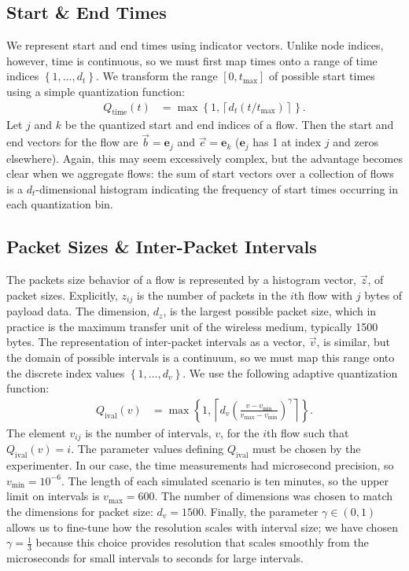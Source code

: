 \documentclass[conference]{IEEEtran}
\newcommand{\Qt}{Q_{\text{time}}}
\newcommand{\Qi}{Q_{\text{ival}}}
\newcommand{\set}[1]{\left\{#1\right\}}
\newcommand{\ceil}[1]{\left\lceil#1\right\rceil}
\newcommand{\fracp}[2]{\left(\frac{#1}{#2}\right)}
\newcommand{\fracpx}[2]{(#1/#2)}
\begin{document}
\subsection{Start \& End Times}

We represent start and end times using indicator vectors. Unlike node indices, however, time is continuous, so we must first map times onto a range of time indices $\set{1,\dots,d_t}$. We transform the range $[0,t_{\max}]$ of possible start times using a simple quantization function:
\begin{align}
\label{eqn:time-quantization}
\Qt(t) &= \max\set{1,\ceil{d_t\fracpx{t}{t_{\max}}}}.
\end{align}
Let $j$ and $k$ be the quantized start and end indices of a flow. Then the start and end vectors for the flow are $\vec{b}=\mathbf{e}_j$ and $\vec{e}=\mathbf{e}_k$ ($\mathbf{e}_j$ has 1 at index $j$ and zeros elsewhere). Again, this may seem excessively complex, but the advantage becomes clear when we aggregate flows: the sum of start vectors over a collection of flows is a $d_t$-dimensional histogram indicating the frequency of start times occurring in each quantization bin.

\subsection{Packet Sizes \& Inter-Packet Intervals}

The packets size behavior of a flow is represented by a histogram vector, $\vec{z}$, of packet sizes. Explicitly,  $z_{ij}$ is the number of packets in the $i$th flow with $j$ bytes of payload data. The dimension, $d_z$, is the largest possible packet size, which in practice is the maximum transfer unit of the wireless medium, typically 1500 bytes. The representation of inter-packet intervals as a vector, $\vec{v}$, is similar, but the domain of possible intervals is a continuum, so we must map this range onto the discrete index values $\left\{1,\dots,d_v\right\}$. We use the following adaptive quantization function:
\begin{align}
\label{eqn:interval-quantization}
\Qi(v) &= \max\set{1,\ceil{d_v\fracp{v-v_{\min}}{v_{\max}-v_{\min}}^\gamma}}.
\end{align}
The element $v_{ij}$ is the number of intervals, $v$, for the $i$th flow such that $\Qi(v)=i$.
The parameter values defining $\Qi$ must be chosen by the experimenter. In our case, the time measurements had microsecond precision, so $v_{\min}=10^{-6}$. The length of each simulated scenario is ten minutes, so the upper limit on intervals is $v_{\max}=600$. The number of dimensions was chosen to match the dimensions for packet size: $d_v=1500$. Finally, the parameter $\gamma\in(0,1)$ allows us to fine-tune how the resolution scales with interval size; we have chosen $\gamma=\frac{1}{3}$ because this choice provides resolution that scales smoothly from the microseconds for small intervals to seconds for large intervals.
\end{document}
